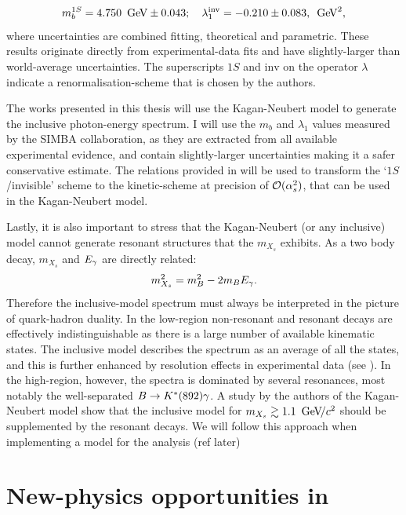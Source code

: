 \begin{equation}\label{eq:simba_result}
    m_b^{1S} =4.750~\mathrm{\,Ge\kern -0.1em V} \pm 0.043;  \quad \lambda^{\mathrm{inv}}_1 = -0.210\pm0.083,~\mathrm{\,Ge\kern -0.1em V}^2, 
\end{equation}
where uncertainties are combined fitting, theoretical and parametric.
These results originate directly from experimental-data fits and have slightly-larger than world-average uncertainties.
The superscripts $1S$ and $\mathrm{inv}$ on the operator $\lambda$ indicate a renormalisation-scheme that is chosen by the authors.

The works presented in this thesis will use the Kagan-Neubert model to generate the inclusive photon-energy spectrum.
I will use the $m_b$ and $\lambda_1$ values measured by the SIMBA collaboration, as they are extracted from all available experimental evidence, and contain slightly-larger uncertainties making it a safer conservative estimate.
The relations provided in \cite{Ligeti:2008ac} will be used to transform the `$1S$/invisible' scheme to the kinetic-scheme at precision of ${\cal O}(\alpha_s^2)$, that can be used in the Kagan-Neubert model.

Lastly, it is also important to stress that the Kagan-Neubert (or any inclusive) model cannot generate resonant structures that the $m_{X_s}$ exhibits.
As a two body decay, $m_{X_s}$ and ${E_{\gamma}}$ are directly related:
\begin{equation}
    m_{X_s}^2 = m_B^2 - 2m_B{E_{\gamma}}.
\end{equation}
Therefore the inclusive-model spectrum must always be interpreted in the picture of quark-hadron duality.
In the low-\Egamma region non-resonant and resonant decays are effectively indistinguishable as there is a large number of available kinematic states.
The inclusive model describes the spectrum as an average of all the states, and this is further enhanced by resolution effects in experimental data (see ).
In the high-\Egamma region, however, the spectra is dominated by several resonances, most notably the well-separated $B\rightarrow K^*(892)\gamma$.
A study by the authors of the Kagan-Neubert model \cite{Kagan:1998ym} show that the inclusive model for $m_{X_s}\gtrsim 1.1~{\mathrm{\,Ge\kern -0.1em V\!/}c^2}$ should be supplemented by the resonant decays.
We will follow this approach when implementing a model for the analysis (ref later)

\section{New-physics opportunities in \texorpdfstring{\BtoXsdgamma}{B->Xsg}}\label{sec:btosgamma_bsm}

